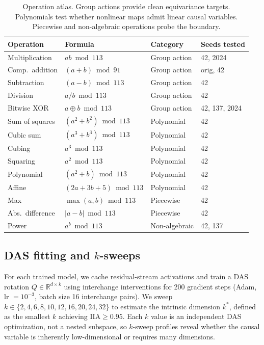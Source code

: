 \documentclass{article}
\newcommand{\IIA}{\mathrm{IIA}}
\newcommand{\R}{\mathbb{R}}
\begin{document}
\begin{table}[t]
\centering
\small
\begin{tabular}{llll}
\toprule
Operation & Formula & Category & Seeds tested \\
\midrule
Multiplication & $ab \bmod 113$ & Group action & 42, 2024 \\
Comp.\ addition & $(a{+}b) \bmod 91$ & Group action & orig, 42 \\
Subtraction & $(a{-}b) \bmod 113$ & Group action & 42 \\
Division & $a/b \bmod 113$ & Group action & 42 \\
Bitwise XOR & $a \oplus b \bmod 113$ & Group action & 42, 137, 2024 \\
\midrule
Sum of squares & $(a^2{+}b^2) \bmod 113$ & Polynomial & 42 \\
Cubic sum & $(a^3{+}b^3) \bmod 113$ & Polynomial & 42 \\
Cubing & $a^3 \bmod 113$ & Polynomial & 42 \\
Squaring & $a^2 \bmod 113$ & Polynomial & 42 \\
Polynomial & $(a^2{+}b) \bmod 113$ & Polynomial & 42 \\
Affine & $(2a{+}3b{+}5) \bmod 113$ & Polynomial & 42 \\
\midrule
Max & $\max(a,b) \bmod 113$ & Piecewise & 42 \\
Abs.\ difference & $|a{-}b| \bmod 113$ & Piecewise & 42 \\
Power & $a^b \bmod 113$ & Non-algebraic & 42, 137 \\
\bottomrule
\end{tabular}
\caption{Operation atlas. Group actions provide clean equivariance targets.
Polynomials test whether nonlinear maps admit linear causal variables. Piecewise
and non-algebraic operations probe the boundary.}
\label{tab:operations}
\end{table}

\subsection{DAS fitting and $k$-sweeps}

For each trained model, we cache residual-stream activations and train a DAS
rotation $Q \in \R^{d \times k}$ using interchange interventions for 200
gradient steps (Adam, lr $= 10^{-3}$, batch size 16 interchange pairs).
We sweep $k \in \{2, 4, 6, 8, 10, 12, 16, 20, 24, 32\}$ to
estimate the intrinsic dimension $k^*$, defined as the smallest $k$ achieving
$\IIA \geq 0.95$. Each $k$ value is an independent DAS optimization, not a nested subspace, so $k$-sweep profiles reveal whether the causal variable
is inherently low-dimensional or requires many dimensions.
\end{document}
